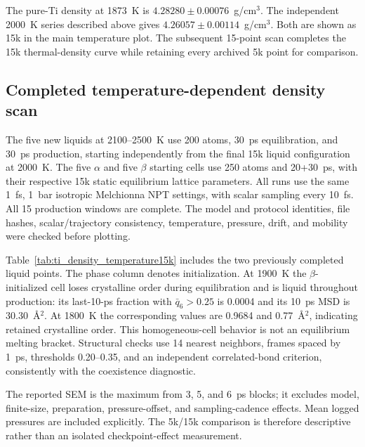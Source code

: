 \documentclass[10pt]{article}
\begin{document}
The pure-Ti density at 1873~K is $4.28280\pm0.00076$~g/cm$^3$. The independent 2000~K series described above gives $4.26057\pm0.00114$~g/cm$^3$. Both are shown as 15k in the main temperature plot. The subsequent 15-point scan completes the 15k thermal-density curve while retaining every archived 5k point for comparison.

\subsection{Completed temperature-dependent density scan}
The five new liquids at 2100--2500~K use 200 atoms, 30~ps equilibration, and 30~ps production, starting independently from the final 15k liquid configuration at 2000~K. The five $\alpha$ and five $\beta$ starting cells use 250 atoms and 20+30~ps, with their respective 15k static equilibrium lattice parameters. All runs use the same 1~fs, 1~bar isotropic Melchionna NPT settings, with scalar sampling every 10~fs. All 15 production windows are complete. The model and protocol identities, file hashes, scalar/trajectory consistency, temperature, pressure, drift, and mobility were checked before plotting.

Table~\ref{tab:ti_density_temperature15k} includes the two previously completed liquid points. The phase column denotes initialization. At 1900~K the $\beta$-initialized cell loses crystalline order during equilibration and is liquid throughout production: its last-10-ps fraction with $\bar q_6>0.25$ is 0.0004 and its 10~ps MSD is 30.30~\AA$^2$. At 1800~K the corresponding values are 0.9684 and 0.77~\AA$^2$, indicating retained crystalline order. This homogeneous-cell behavior is not an equilibrium melting bracket. Structural checks use 14 nearest neighbors, frames spaced by 1~ps, thresholds 0.20--0.35, and an independent correlated-bond criterion, consistently with the coexistence diagnostic.

The reported SEM is the maximum from 3, 5, and 6~ps blocks; it excludes model, finite-size, preparation, pressure-offset, and sampling-cadence effects. Mean logged pressures are included explicitly. The 5k/15k comparison is therefore descriptive rather than an isolated checkpoint-effect measurement.



\end{document}
